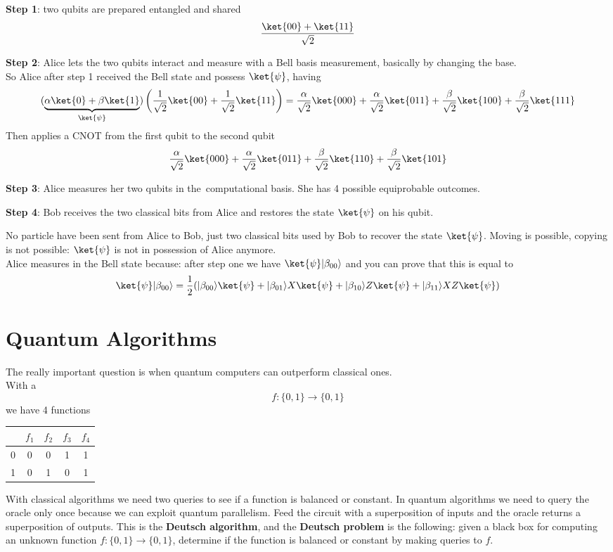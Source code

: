 \documentclass[10pt]{report}
\begin{document}
\begin{list}{}{}
	\item \textbf{Step 1}: two qubits are prepared entangled and shared
	$$\frac{\ket{00}+\ket{11}}{\sqrt{2}}$$
	\item \textbf{Step 2}: Alice lets the two qubits interact and measure with a Bell basis measurement, basically by changing the base.\\
	So Alice after step 1 received the Bell state and possess $\ket{\psi}$, having 
	$$(\underset{\ket{\psi}}{\underbrace{\alpha\ket{0}+\beta\ket{1}}})\left(\frac{1}{\sqrt{2}}\ket{00}+\frac{1}{\sqrt{2}}\ket{11}\right)=\frac{\alpha}{\sqrt{2}}\ket{000}+\frac{\alpha}{\sqrt{2}}\ket{011}+\frac{\beta}{\sqrt{2}}\ket{100}+\frac{\beta}{\sqrt{2}}\ket{111}$$
	Then applies a CNOT from the first qubit to the second qubit
	$$\frac{\alpha}{\sqrt{2}}\ket{000}+\frac{\alpha}{\sqrt{2}}\ket{011}+\frac{\beta}{\sqrt{2}}\ket{110}+\frac{\beta}{\sqrt{2}}\ket{101}$$
	\item \textbf{Step 3}: Alice measures her two qubits in the\ computational basis. She has 4 possible equiprobable outcomes.
	\item \textbf{Step 4}: Bob receives the two classical bits from Alice and restores the state $\ket{\psi}$ on his qubit.
\end{list}
No particle have been sent from Alice to Bob, just two classical bits used by Bob to recover the state $\ket{\psi}$. Moving is possible, copying is not possible: $\ket{\psi}$ is not in possession of Alice anymore.\\
Alice measures in the Bell state because: after step one we have $\ket{\psi}|\beta_{00}\rangle$ and you can prove that this is equal to $$\ket{\psi}|\beta_{00}\rangle = \frac{1}{2}(|\beta_{00}\rangle\ket{\psi} + |\beta_{01}\rangle X\ket{\psi} + |\beta_{10}\rangle Z\ket{\psi} + |\beta_{11}\rangle XZ\ket{\psi})$$
\section{Quantum Algorithms}
The really important question is when quantum computers can outperform classical ones.\\
With a $$f:\{0,1\}\rightarrow\{0,1\}$$ we have 4 functions
\begin{center}
	\begin{tabular}{c | c c c c}
& $f_1$ & $f_2$ & $f_3$ & $f_4$\\
\hline
0 & 0 & 0 & 1 & 1\\
1 & 0 & 1 & 0 & 1
\end{tabular}
\end{center}
With classical algorithms we need two queries to see if a function is balanced or constant. In quantum algorithms we need to query the oracle only once because we can exploit quantum parallelism. Feed the circuit with a superposition of inputs and the oracle returns a superposition of outputs. This is the \textbf{Deutsch algorithm}, and the \textbf{Deutsch problem} is the following: given a black box for computing an unknown function $f:\{0,1\}\rightarrow\{0,1\}$, determine if the function is balanced or constant by making queries to $f$.
\end{document}
